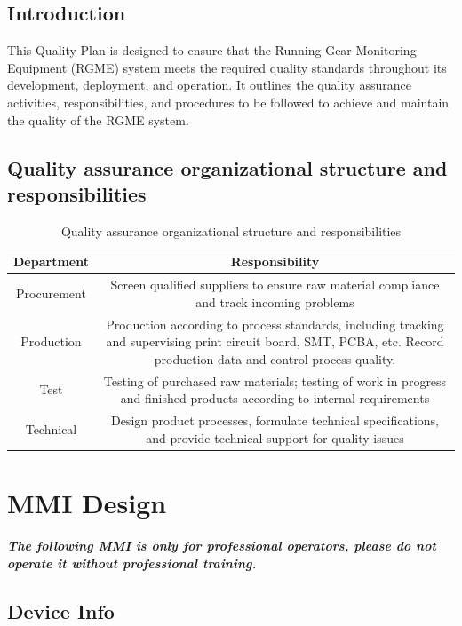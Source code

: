 \documentclass{article}
\begin{document}
\subsection{Introduction}
This Quality Plan is designed to ensure that the Running Gear Monitoring Equipment (RGME) system meets the required quality standards throughout its development, deployment, and operation. It outlines the quality assurance activities, responsibilities, and procedures to be followed to achieve and maintain the quality of the RGME system.
\subsection{Quality assurance organizational structure and responsibilities}
\begin{table}
    \centering
    \caption{Quality assurance organizational structure and responsibilities}
    \label{tab:order-ratio}
    \begin{tabular}{|c|c|}
        \hline
        \toprule
        Department & Responsibility \\
        \midrule
        Procurement & Screen qualified suppliers to ensure raw material compliance and track incoming problems \\ \hline
        Production & Production according to process standards, including tracking and supervising print circuit board, SMT, PCBA, etc. Record production data and control process quality. \\   \hline
        Test & Testing of purchased raw materials; testing of work in progress and finished products according to internal requirements \\   \hline
        Technical & Design product processes, formulate technical specifications, and provide technical support for quality issues \\ \hline
        \bottomrule
    \end{tabular}
\end{table}

\clearpage
\section{MMI Design}

{\bfseries\emph{The following MMI is only for professional operators, please do not operate it without professional training.}}
\subsection{Device Info}
\end{document}
